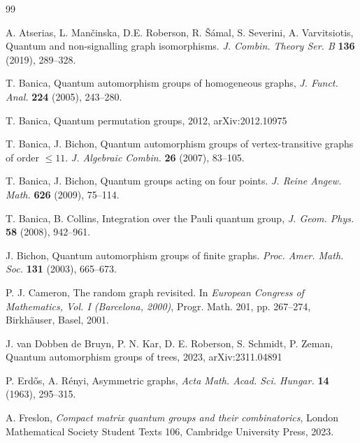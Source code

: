 \documentclass[a4paper]{amsart}
\numberwithin{equation}{section}
\theoremstyle{change}
\begin{document}
\begin{thebibliography}{99}

A. Atserias, L. Man\v{c}inska, D.E. Roberson, R. \v{S}\'{a}mal, S. Severini, A. Varvitsiotis,
Quantum and non-signalling graph isomorphisms. 
\emph{J. Combin. Theory Ser. B} \textbf{136} (2019), 289--328. 

T. Banica, Quantum automorphism groups of homogeneous graphs, \emph{J. Funct. Anal.} \textbf{224} (2005), 243--280. 

T. Banica, Quantum permutation groups, 2012, arXiv:2012.10975

T. Banica, J. Bichon, Quantum automorphism groups of vertex-transitive graphs of order {$\leq11$}. 
\emph{J. Algebraic Combin.} \textbf{26} (2007), 83--105. 

T. Banica, J. Bichon, Quantum groups acting on four points. 
\emph{J. Reine Angew. Math.} \textbf{626} (2009), 75--114. 

T. Banica, B. Collins, Integration over the {P}auli quantum group,
\emph{J. Geom. Phys.} \textbf{58} (2008), 942--961. 

J. Bichon, Quantum automorphism groups of finite graphs. \emph{Proc. Amer. Math. Soc.} \textbf{131} (2003), 665--673. 

P. J. Cameron, The random graph revisited. 
In \emph{European {C}ongress of {M}athematics, {V}ol. {I} ({B}arcelona, 2000)}, Progr. Math. 201, pp. 267--274, Birkh\"{a}user, Basel, 2001. 

J. van Dobben de Bruyn, P. N. Kar, D. E. Roberson, S. Schmidt, P. Zeman, Quantum automorphism groups of trees, 2023,
arXiv:2311.04891

P. Erd\H{o}s, A. R\'{e}nyi, Asymmetric graphs,
\emph{Acta Math. Acad. Sci. Hungar.} \textbf{14} (1963),
295--315. 

A. Freslon, \emph{Compact matrix quantum groups and their combinatorics},
London Mathematical Society Student Texts 106, Cambridge University Press, 2023. 


\end{thebibliography}
\end{document}
